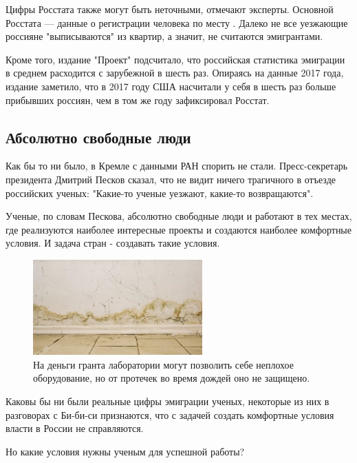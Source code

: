 Цифры Росстата также могут быть неточными, отмечают эксперты. Основной  Росстата --- данные о регистрации человека по месту . Далеко не все уезжающие россияне "выписываются" из квартир, а значит, не считаются эмигрантами.

Кроме того, издание "Проект" подсчитало, что российская статистика эмиграции в среднем расходится с зарубежной в шесть раз. Опираясь на данные 2017 года, издание заметило, что в 2017 году США насчитали у себя в шесть раз больше прибывших россиян, чем в том же году зафиксировал Росстат.

\subsection{Абсолютно свободные люди}

Как бы то ни было, в Кремле с данными РАН спорить не стали. Пресс-секретарь президента Дмитрий Песков сказал, что не видит ничего трагичного в отъезде российских ученых: "Какие-то ученые уезжают, какие-то возвращаются".

Ученые, по словам Пескова, абсолютно свободные люди и работают в тех местах, где реализуются наиболее интересные проекты и создаются наиболее комфортные условия. И задача стран - создавать такие условия.

\begin{figure}
    \begin{center}
        \includegraphics[width=0.58\textwidth]{img/wall.png}
    \end{center}
    \caption{На деньги гранта лаборатории могут позволить себе неплохое оборудование, но от протечек во время дождей оно не защищено.}
\end{figure}
Каковы бы ни были реальные цифры эмиграции ученых, некоторые из них в разговорах с Би-би-си признаются, что с задачей создать комфортные условия власти в России не справляются.

Но какие условия нужны ученым для успешной работы?


